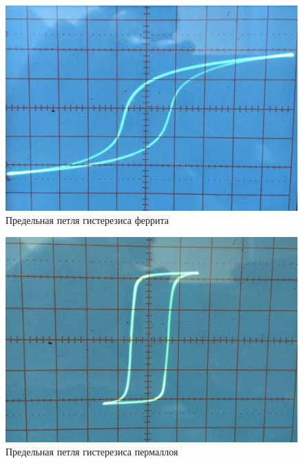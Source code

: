 \documentclass[a4paper,11pt]{extarticle} %
\begin{document}
\begin{figure}[H]
    \centering
    \includegraphics[width = 15 cm]{Феррит.JPG}
    \caption{Предельная петля гистерезиса феррита}
\end{figure}


\begin{figure}[H]
    \centering
    \includegraphics[width = 15 cm]{Пермаллой.JPG}
    \caption{Предельная петля гистерезиса пермаллоя}
\end{figure}
\end{document}
